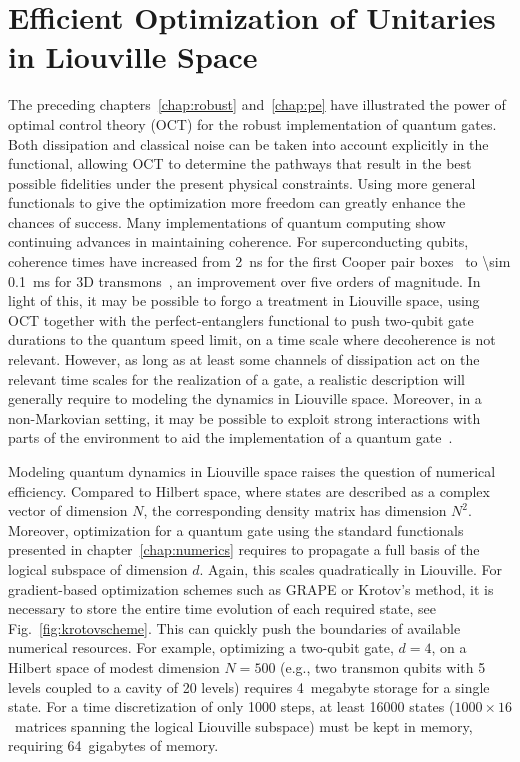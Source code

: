 \chapter{Efficient Optimization of Unitaries in Liouville Space}
\label{chap:3states}


The preceding chapters~\ref{chap:robust} and~\ref{chap:pe} have illustrated
the power of optimal control theory (OCT) for the robust implementation of quantum
gates. Both dissipation and classical noise can be taken into account explicitly
in the functional, allowing OCT to determine the pathways that result in the
best possible fidelities under the present physical constraints. Using more
general functionals to give the optimization more freedom can greatly enhance
the chances of success. Many implementations of quantum computing show
continuing advances in maintaining coherence. For superconducting qubits,
coherence times have increased from \SI{2}{ns} for the first Cooper pair
boxes~\cite{NakamuraN1999} to \SI{\sim 0.1}{ms} for 3D
transmons~\cite{RigettiPRB2012}, an improvement over five orders of magnitude.
In light of this, it may be possible to forgo a treatment in Liouville space,
using OCT together with the perfect-entanglers functional to push two-qubit gate
durations to the quantum speed limit, on a time scale where decoherence is not
relevant. However, as long as at least some channels of dissipation act
on the relevant time scales for the realization of a gate, a realistic
description will generally require to modeling the dynamics in Liouville space.
Moreover, in a non-Markovian setting, it may be possible to exploit strong
interactions with parts of the environment to aid the implementation of
a quantum gate~\cite{ReichArXiv1409.7497}.

Modeling quantum dynamics in Liouville space raises the question of numerical
efficiency. Compared to Hilbert space, where states are described as a complex
vector of dimension $N$, the corresponding density matrix has dimension $N^2$.
Moreover, optimization for a quantum gate using the standard functionals
presented in chapter~\ref{chap:numerics} requires to propagate a full basis of
the logical subspace of dimension $d$. Again, this scales quadratically in
Liouville. For gradient-based optimization schemes such as GRAPE or Krotov's
method, it is necessary to store the entire time evolution of each required
state, see Fig.~\ref{fig:krotovscheme}. This can quickly push the boundaries of
available numerical resources. For example, optimizing a two-qubit gate, $d=4$,
on a Hilbert space of modest dimension $N=500$ (e.g., two transmon qubits with
5 levels coupled to a cavity of 20 levels) requires \SI{4}{megabyte} storage for
a single state. For a time discretization of only 1000 steps, at least 16000
states ($1000 \times 16$~matrices spanning the logical Liouville subspace) must
be kept in memory, requiring 64~gigabytes of memory.

